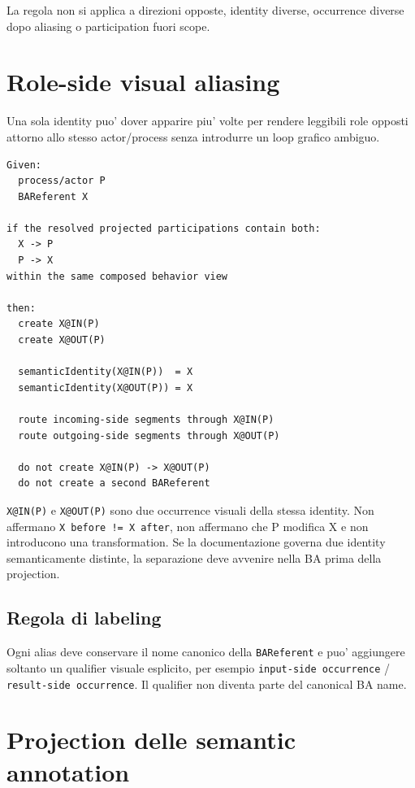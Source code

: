 \documentclass[11pt,a4paper]{article}
\newcommand{\BAR}{\texttt{BAReferent}}
\newcommand{\RuleTag}{\ddtatag{DDTABlue}{PROJECTION RULE}}
\begin{document}
La regola non si applica a direzioni opposte, identity diverse, occurrence diverse dopo aliasing o participation fuori scope.

\section{Role-side visual aliasing}
\RuleTag

Una sola identity puo' dover apparire piu' volte per rendere leggibili role opposti attorno allo stesso actor/process senza introdurre un loop grafico ambiguo.

\begin{lstlisting}
Given:
  process/actor P
  BAReferent X

if the resolved projected participations contain both:
  X -> P
  P -> X
within the same composed behavior view

then:
  create X@IN(P)
  create X@OUT(P)

  semanticIdentity(X@IN(P))  = X
  semanticIdentity(X@OUT(P)) = X

  route incoming-side segments through X@IN(P)
  route outgoing-side segments through X@OUT(P)

  do not create X@IN(P) -> X@OUT(P)
  do not create a second BAReferent
\end{lstlisting}

\begin{ddtacore}[title={Visual alias non implica trasformazione}]
\texttt{X@IN(P)} e \texttt{X@OUT(P)} sono due occurrence visuali della stessa identity. Non affermano \texttt{X before != X after}, non affermano che P modifica X e non introducono una transformation. Se la documentazione governa due identity semanticamente distinte, la separazione deve avvenire nella BA prima della projection.
\end{ddtacore}

\subsection{Regola di labeling}

Ogni alias deve conservare il nome canonico della \BAR{} e puo' aggiungere soltanto un qualifier visuale esplicito, per esempio \texttt{input-side occurrence} / \texttt{result-side occurrence}. Il qualifier non diventa parte del canonical BA name.

\clearpage
\section{Projection delle semantic annotation}
\end{document}
